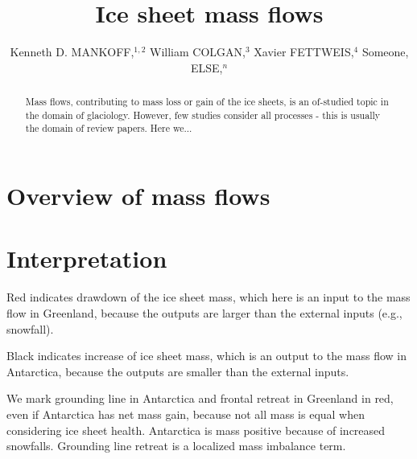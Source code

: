 \documentclass[review,jog]{igs}
\begin{document}
\title[Sankey mass flows]{Ice sheet mass flows}

\author[Mankoff and others]
       {Kenneth D. MANKOFF,$^{1,2}$
         William COLGAN,$^3$
         Xavier FETTWEIS,$^4$
         Someone, ELSE,$^n$}


\begin{frontmatter}
\maketitle
\begin{abstract}
  Mass flows, contributing to mass loss or gain of the ice sheets, is an of-studied topic in the domain of glaciology. However, few studies consider all processes - this is usually the domain of review papers.  Here we...
\end{abstract}
\end{frontmatter}

\section{Overview of mass flows}

\section{Interpretation}

Red indicates drawdown of the ice sheet mass, which here is an input to the mass flow in Greenland, because the outputs are larger than the external inputs (e.g., snowfall).

Black indicates increase of ice sheet mass, which is an output to the mass flow in Antarctica, because the outputs are smaller than the external inputs.

We mark grounding line in Antarctica and frontal retreat in Greenland in red, even if Antarctica has net mass gain, because not all mass is equal when considering ice sheet health. Antarctica is mass positive because of increased snowfalls. Grounding line retreat is a localized mass imbalance term.
\end{document}
